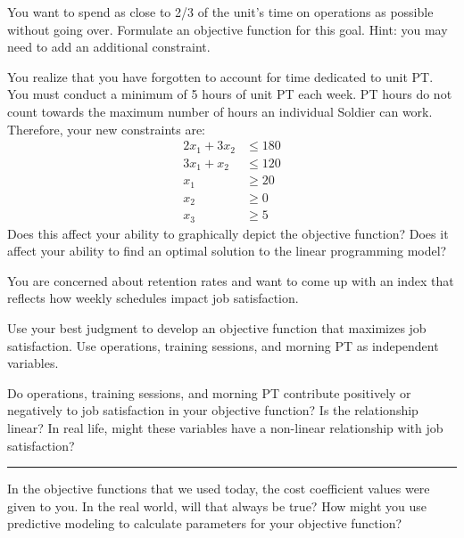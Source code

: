 \documentclass[11pt]{article}
\begin{document}
\vfill

\newpage


\leavevmode\hspace*{\parindent}You want to spend as close to 2/3 of the unit's time on operations as possible without going over.
Formulate an objective function for this goal. Hint: you may need to add an additional constraint.

\vfill

You realize that you have forgotten to account for time dedicated to unit PT. You must conduct a minimum of 5 hours of unit PT each week. PT hours do not count towards the maximum number of hours an individual Soldier can work. Therefore, your new constraints are: 
\begin{align*}
2x_1 + 3x_2 &\le 180 \\
3x_1 + x_2 &\le 120 \\
x_1 &\ge 20 \\
x_2 &\ge 0 \\
x_3 &\ge 5
\end{align*}
Does this affect your ability to graphically depict the objective function?
Does it affect your ability to find an optimal solution to the linear programming model?

\vfill


\leavevmode\hspace*{\parindent}
You are concerned about retention rates and want to come up with an index that reflects how weekly schedules impact job satisfaction. 

Use your best judgment to develop an objective function that maximizes job satisfaction. Use operations, training sessions, and morning PT as independent variables.

\vfill

Do operations, training sessions, and morning PT contribute positively or negatively to job satisfaction in your objective function? Is the relationship linear? In real life, might these variables have a non-linear relationship with job satisfaction?

\vfill

\hrule


\noindent In the objective functions that we used today, the cost coefficient values were given to you. In the real world, will that always be true? How might you use predictive modeling to calculate parameters for your objective function?
\end{document}
